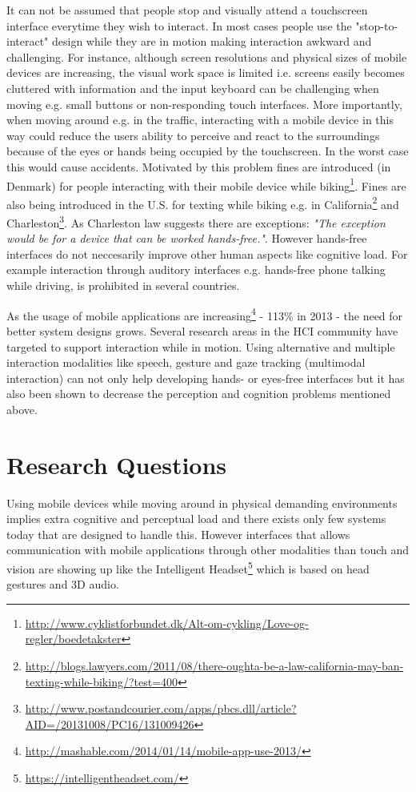 It can not be assumed that people stop and visually attend a touchscreen interface everytime they wish to interact. In most cases people use the "stop-to-interact" design while they are in motion making interaction awkward and challenging. For instance, although screen resolutions and physical sizes of mobile devices are increasing, the visual work space is limited i.e. screens easily becomes cluttered with information and the input keyboard can be challenging when moving e.g. small buttons or non-responding touch interfaces. More importantly, when moving around e.g. in the traffic, interacting with a mobile device in this way could reduce the users ability to perceive and react to the surroundings because of the eyes or hands being occupied by the touchscreen. In the worst case this would cause accidents. Motivated by this problem fines are introduced (in Denmark) for people interacting with their mobile device while biking\footnote{\url{http://www.cyklistforbundet.dk/Alt-om-cykling/Love-og-regler/boedetakster}}. Fines are also being introduced in the U.S. for texting while biking e.g. in California\footnote{\url{http://blogs.lawyers.com/2011/08/there-oughta-be-a-law-california-may-ban-texting-while-biking/?test=400}} and Charleston\footnote{\url{http://www.postandcourier.com/apps/pbcs.dll/article?AID=/20131008/PC16/131009426}}. As Charleston law suggests there are exceptions: \textit{"The exception would be for a device that can be worked hands-free."}. However hands-free interfaces do not neccesarily improve other human aspects like cognitive load. For example interaction through auditory interfaces e.g. hands-free phone talking while driving, is prohibited in several countries.

As the usage of mobile applications are increasing\footnote{\url{http://mashable.com/2014/01/14/mobile-app-use-2013/}} - 113\% in 2013 - the need for better system designs grows. Several research areas in the HCI community have targeted to support interaction while in motion. Using alternative and multiple interaction modalities like speech, gesture and gaze tracking (multimodal interaction) can not only help developing hands- or eyes-free interfaces but it has also been shown to decrease the perception and cognition problems mentioned above.

\newpage

\section{Research Questions}
Using mobile devices while moving around in physical demanding environments implies extra cognitive and perceptual load and there exists only few systems today that are designed to handle this. However interfaces that allows communication with mobile applications through other modalities than touch and vision are showing up like the Intelligent Headset\footnote{\url{https://intelligentheadset.com/}} which is based on head gestures and 3D audio.

